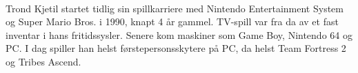 \item[Trond Kjetil (25)] \hfill \\
Trond Kjetil startet tidlig sin spillkarriere med Nintendo Entertainment System og Super Mario Bros. i 1990, knapt 4 år gammel. TV-spill var fra da av et fast inventar i hans fritidssysler. Senere kom maskiner som Game Boy, Nintendo 64 og PC. I dag spiller han helst førstepersonsskytere på PC, da helst Team Fortress 2 og Tribes Ascend.